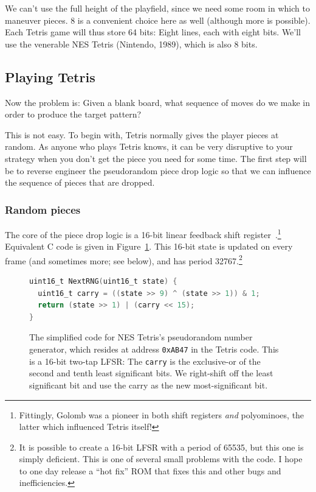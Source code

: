 \documentclass[twocolumn]{article}
\begin{document}
We can't use the full height of the playfield, since we need some room
in which to maneuver pieces. 8 is a convenient choice here as well
(although more is possible). Each Tetris game will thus store 64 bits:
Eight lines, each with eight bits. We'll use the venerable NES Tetris
(Nintendo, 1989), which is also 8 bits.


\subsection{Playing Tetris}

Now the problem is: Given a blank board, what sequence of moves do
we make in order to produce the target pattern?

This is not easy. To begin with, Tetris normally gives the player
pieces at random. As anyone who plays Tetris knows, it can be very
disruptive to your strategy when you don't get the piece you need for
some time. The first step will be to reverse engineer the pseudorandom
piece drop logic so that we can influence the sequence of pieces that
are dropped.

\subsubsection{Random pieces}

The core of the piece drop logic is a 16-bit linear feedback shift
register~\cite{golomb1967shift}.\!\footnote{Fittingly, Golomb was a
  pioneer in both shift registers {\em and} polyominoes, the latter
  which influenced Tetris itself!} Equivalent C code is given in
Figure~\ref{fig:nextrng}. This 16-bit state is updated on every frame
(and sometimes more; see below), and has period 32767.\footnote{ It is
  possible to create a 16-bit LFSR with a period of 65535, but this
  one is simply deficient. This is one of several small problems with
  the code. I hope to one day release a ``hot fix'' ROM that fixes
  this and other bugs and inefficiencies.}

\begin{figure}
  \centering
  \begin{lstlisting}[language=C]
uint16_t NextRNG(uint16_t state) {
  uint16_t carry = ((state >> 9) ^ (state >> 1)) & 1;
  return (state >> 1) | (carry << 15);
}
  \end{lstlisting}
  \caption { The simplified code for NES Tetris's pseudorandom number
    generator, which resides at address {\tt 0xAB47} in the Tetris
    code. This is a 16-bit two-tap LFSR: The {\tt carry} is the
    exclusive-or of the second and tenth least significant bits. We
    right-shift off the least significant bit and use the carry as the
    new most-significant bit.} \label{fig:nextrng}
\end{figure}
\end{document}

